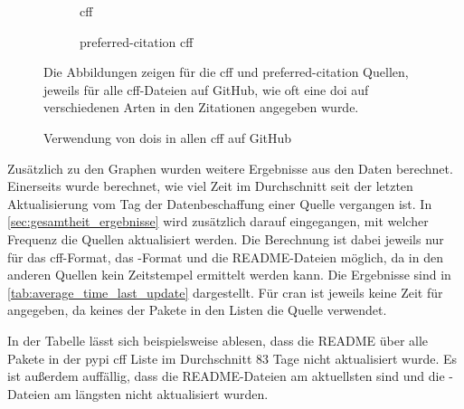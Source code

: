 \begin{figure}
    \begin{subfigure}{.5\textwidth}
        \centering
        
        \caption{\gls{cff}}
        \label{fig:full_cff_doi}
    \end{subfigure}%
    \begin{subfigure}{.5\textwidth}
        \centering
        
        \caption{\glqq preferred-citation\grqq{} \gls{cff}}
        \label{fig:full_preferred_citation_doi}
    \end{subfigure}
    \caption{Verwendung von \gls{doi}s in allen \gls{cff} auf GitHub}
    \label{fig:full_doi}
    \small
    Die Abbildungen zeigen für die \gls{cff} und \glqq preferred-citation\grqq{} Quellen, jeweils für alle \gls{cff}-Dateien auf GitHub, wie oft eine \gls{doi} auf verschiedenen Arten in den Zitationen angegeben wurde.
\end{figure}

Zusätzlich zu den Graphen wurden weitere Ergebnisse aus den Daten berechnet.
Einerseits wurde berechnet, wie viel Zeit im Durchschnitt seit der letzten Aktualisierung vom Tag der Datenbeschaffung einer Quelle vergangen ist.
In \autoref{sec:gesamtheit_ergebnisse} wird zusätzlich darauf eingegangen, mit welcher Frequenz die Quellen aktualisiert werden.
Die Berechnung ist dabei jeweils nur für das \gls{cff}-Format, das -Format und die README-Dateien möglich, da in den anderen Quellen kein Zeitstempel ermittelt werden kann.
Die Ergebnisse sind in \autoref{tab:average_time_last_update} dargestellt.
Für \gls{cran} ist jeweils keine Zeit für  angegeben, da keines der Pakete in den Listen die Quelle verwendet.

In der Tabelle lässt sich beispielsweise ablesen, dass die README über alle Pakete in der \gls{pypi} \gls{cff} Liste im Durchschnitt 83 Tage nicht aktualisiert wurde.
Es ist außerdem auffällig, dass die README-Dateien am aktuellsten sind und die -Dateien am längsten nicht aktualisiert wurden.

